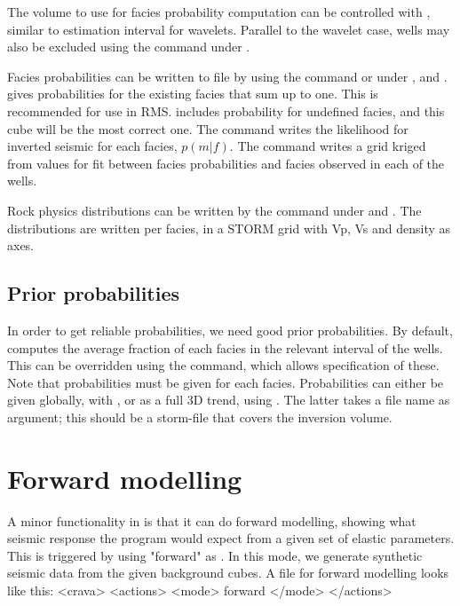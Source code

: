 The volume to use for facies probability computation can be controlled
with , similar to estimation interval
for wavelets. Parallel to the wavelet case, wells may also be excluded
using the  command under . 

Facies probabilities can be written to file by using the command  
or 
under ,  and .  gives probabilities for the existing facies that sum up to one. This is recommended for use in RMS.  includes probability for undefined facies, and this cube will be the most correct one. The command  writes the likelihood for inverted seismic for each
facies, $p(m|f)$. The command  writes a grid kriged from values for fit between facies probabilities and facies observed in each of the wells.

Rock physics distributions can be written by the command  under  and . The distributions are written per facies, in a STORM grid with Vp, Vs and density as axes.

\subsection{Prior probabilities}
In order to get reliable probabilities, we need good prior
probabilities. By default, \crava computes the average fraction of
each facies in the relevant interval of the wells. This can be
overridden using the  command, which
allows specification of these. Note that probabilities must be given
for each facies. Probabilities can either be given globally, with
, or as a full 3D trend, using
. The latter takes a file name as argument; this
should be a storm-file that covers the inversion volume. 

\section{Forward modelling}
\label{sec:forwardusr}
A minor functionality in \crava is that it can do forward modelling,
showing what seismic response the program would expect from a given
set of elastic parameters. This is triggered by using "forward" as
. In this mode, we generate synthetic seismic data from the
given background cubes. A file for forward modelling looks like this: 
<crava>
<actions>
  <mode> forward </mode>
</actions>

